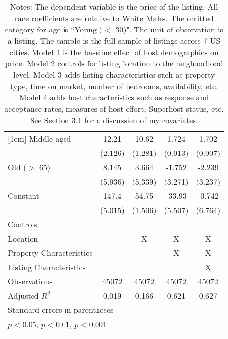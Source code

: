 {\begin{longtable}{l*{4}{c}}
[1em]
Middle-aged         &       12.21\sym{***}&       10.62\sym{***}&       1.724         &       1.702         \\
                    &     (2.126)         &     (1.281)         &     (0.913)         &     (0.907)         \\
[1em]
Old ($>$ 65)           &       8.145         &       3.664         &      -1.752         &      -2.239         \\
                    &     (5.936)         &     (5.339)         &     (3.271)         &     (3.237)         \\
[1em]
Constant            &       147.4\sym{***}&       54.75\sym{***}&      -33.93\sym{***}&      -0.742         \\
                    &     (5.015)         &     (1.506)         &     (5.507)         &     (6.764)         \\
\hline
Controls:        \\
\hspace{3mm} Location  &                &       X         &       X         &       X         \\
\hspace{3mm} Property Characteristics  &                &                &       X         &       X         \\
\hspace{3mm} Listing Characteristics  &                &                &                &       X         \\
\hline
Observations        &       45072         &       45072         &       45072         &       45072         \\
Adjusted \(R^{2}\)  &       0.019         &       0.166         &       0.621         &       0.627         \\
\hline\hline
\multicolumn{5}{l}{\footnotesize Standard errors in parentheses}\\
\multicolumn{5}{l}{\footnotesize \sym{*} \(p<0.05\), \sym{**} \(p<0.01\), \sym{***} \(p<0.001\)}\\
\caption*{Notes: The dependent variable is the price of the listing. All race coefficients are relative to White Males. The omitted category for age is ``Young ($<$ 30)". The unit of observation is a listing. The sample is the full sample of listings across 7 US cities. Model 1 is the baseline effect of host demographics on price. Model 2 controls for listing location to the neighborhood level. Model 3 adds listing characteristics such as property type, time on market, number of bedrooms, availability, etc. Model 4 adds host characteristics such as response and acceptance rates, measures of host effort, Superhost status, etc. See Section 3.1 for a discussion of my covariates. }
\label{Table 4}


\end{longtable}
}


